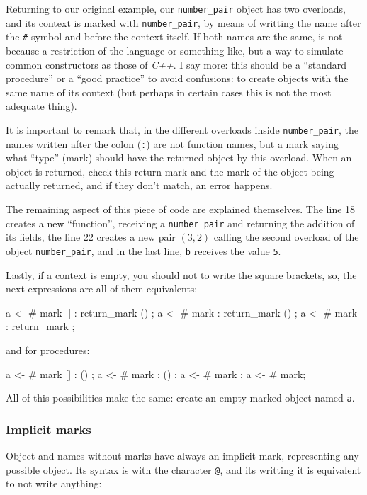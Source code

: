 \documentclass{article}
\begin{document}
Returning to our original example, our \texttt{number\_pair} object has two
overloads, and its context is marked with \texttt{number\_pair}, by means of
writting the name after the \texttt{\#} symbol and before the context itself. If
both names are the same, is not because a restriction of the language or
something like, but a way to simulate common constructors as those of
\textit{C++}. I say more: this should be a ``standard procedure'' or a ``good
practice'' to avoid confusions: to create objects with the same name of its
context (but perhaps in certain cases this is not the most adequate thing).

It is important to remark that, in the different overloads inside
\texttt{number\_pair}, the names written after the colon (\texttt{:}) are not
function names, but a mark saying what ``type'' (mark) should have the returned
object by this overload. When an object is returned, \faupp check this return
mark and the mark of the object being actually returned, and if they don't
match, an error happens.

The remaining aspect of this piece of code are explained themselves. The line 18
creates a new ``function'', receiving a \texttt{number\_pair} and returning the
addition of its fields, the line 22 creates a new pair $(3, 2)$ calling the
second overload of the object \texttt{number\_pair}, and in the last line,
\texttt{b} receives the value \texttt{5}.

Lastly, if a context is empty, you should not to write the square brackets, so,
the next expressions are all of them equivalents:

\begin{faupp2}
  a <- # mark [] : return_mark () {};
  a <- # mark : return_mark () {};
  a <- # mark : return_mark {};
\end{faupp2}

and for procedures:

\begin{faupp2}
  a <- # mark [] : () {};
  a <- # mark : () {};
  a <- # mark {};
  a <- # mark;
\end{faupp2}

All of this possibilities make the same: create an empty marked object named
\texttt{a}.

\subsubsection{Implicit marks}
Object and names without marks have always an implicit mark, representing any
possible object. Its syntax is with the character \texttt{@}, and its writting
it is equivalent to not write anything:
\end{document}
